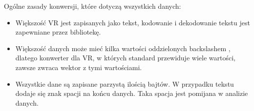 \par
Ogólne zasady konwersji, które dotyczą wszystkich danych:
\begin{itemize}
    \item Większość VR jest zapisanych jako tekst, kodowanie i dekodowanie tekstu jest zapewniane przez bibliotekę.
    \item Większość danych może mieć kilka wartości oddzielonych backslashem \quotett{\textbackslash}, dlatego konwerter dla VR, w których standard przewiduje wiele wartości, zawsze zwraca wektor z tymi wartościami.
    \item Wszystkie dane są zapisane parzystą ilością bajtów.
          W przypadku tekstu dodaje się znak spacji na końcu danych.
          Taka spacja jest pomijana w analizie danych.
\end{itemize}

